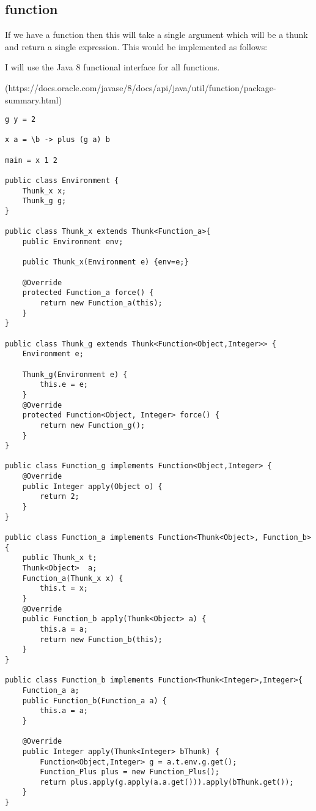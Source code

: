 \documentclass[12pt,a4paper,twoside]{article}
\begin{document}
\subsection{function}

If we have a function then this will take a single argument which will be a thunk and return a single expression. 
This would be implemented as follows:

I will use the Java 8 functional interface for all functions.

(https://docs.oracle.com/javase/8/docs/api/java/util/function/package-summary.html)

\begin{verbatim}
g y = 2
  
x a = \b -> plus (g a) b

main = x 1 2

public class Environment {
    Thunk_x x;
    Thunk_g g;
}

public class Thunk_x extends Thunk<Function_a>{
    public Environment env;

    public Thunk_x(Environment e) {env=e;}

    @Override
    protected Function_a force() {
        return new Function_a(this);
    }
}

public class Thunk_g extends Thunk<Function<Object,Integer>> {
    Environment e;

    Thunk_g(Environment e) {
        this.e = e;
    }
    @Override
    protected Function<Object, Integer> force() {
        return new Function_g();
    }
}

public class Function_g implements Function<Object,Integer> {
    @Override
    public Integer apply(Object o) {
        return 2;
    }
}

public class Function_a implements Function<Thunk<Object>, Function_b> {
    public Thunk_x t;
    Thunk<Object>  a;
    Function_a(Thunk_x x) {
        this.t = x;
    }
    @Override
    public Function_b apply(Thunk<Object> a) {
        this.a = a;
        return new Function_b(this);
    }
}

public class Function_b implements Function<Thunk<Integer>,Integer>{
    Function_a a;
    public Function_b(Function_a a) {
        this.a = a;
    }

    @Override
    public Integer apply(Thunk<Integer> bThunk) {
        Function<Object,Integer> g = a.t.env.g.get();
        Function_Plus plus = new Function_Plus();
        return plus.apply(g.apply(a.a.get())).apply(bThunk.get());
    }
}


\end{verbatim}
\end{document}
